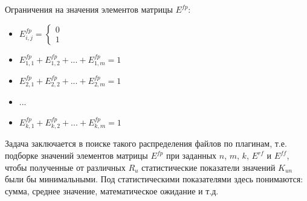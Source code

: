 \documentclass{article}
\begin{document}
  Ограничения на значения элементов матрицы $E^{fp}$:
  \begin{itemize}
    \item[] 
    $
    E^{fp}_{i, j} =
      \begin{cases}
      0 \\
      1
      \end{cases}
    $
    \item[] $E^{fp}_{1, 1} + E^{fp}_{1, 2} + ... + E^{fp}_{1, m} = 1$
    \item[] $E^{fp}_{2, 1} + E^{fp}_{2, 2} + ... + E^{fp}_{2, m} = 1$
    \item[] ...
    \item[] $E^{fp}_{k, 1} + E^{fp}_{k, 2} + ... + E^{fp}_{k, m} = 1$
  \end{itemize}

  
  Задача заключается в поиске такого распределения файлов по плагинам, т.е. подборке значений элементов матрицы $E^{fp}$ при заданных $n$, $m$, $k$, $E^{rf}$ и $E^{ff}$, чтобы полученные от различных $R_{u}$ статистические показатели значений $K_{un}$ были бы минимальными. Под статистическими показателями здесь понимаются: сумма, среднее значение, математическое ожидание и т.д.
\end{document}
